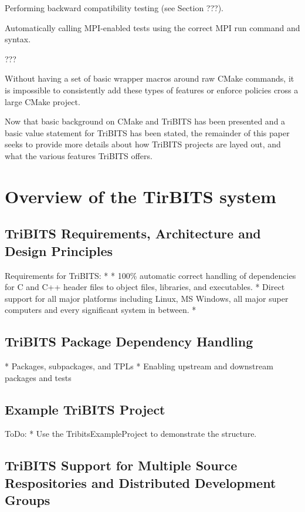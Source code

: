 \documentclass[10pt]{article}
\begin{document}
\begin{compactitem}
\item Performing backward compatibility testing (see Section ???).
\item Automatically calling MPI-enabled tests using the correct MPI run command and syntax.
\item ???
\end{compactitem}

Without having a set of basic wrapper macros around raw CMake commands, it is impossible to consistently add these types of features or enforce policies cross a large CMake project.

Now that basic background on CMake and TriBITS has been presented and a basic value statement for TriBITS has been stated, the remainder of this paper seeks to provide more details about how TriBITS projects are layed out, and what the various features TriBITS offers.

%
\section{Overview of the TirBITS system}
%

%
\subsection{TriBITS Requirements, Architecture and Design Principles}
%

Requirements for TriBITS:
* 
* 100\% automatic correct handling of dependencies for C and C++ header files to object files, libraries, and executables.
* Direct support for all major platforms including Linux, MS Windows,  all major super computers and every significant system in between.
* 

%
\subsection{TriBITS Package Dependency Handling}
%

* Packages, subpackages, and TPLs
* Enabling upstream and downstream packages and tests

%
\subsection{Example TriBITS Project}
%

ToDo:
* Use the TribitsExampleProject to demonstrate the structure.


%
\subsection{TriBITS Support for Multiple Source Respositories and Distributed Development Groups}
%
\end{document}
